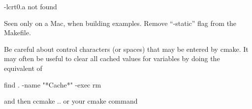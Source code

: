 \begin{codeenv}
-lcrt0.a  not found
\end{codeenv}
Seen only on a Mac, when building examples. Remove ``-static'' flag from the
Makefile.


Be careful about control characters (or spaces) that may be entered by cmake.
It may often be useful to clear all cached values for variables by doing the equivalent of 


\begin{codeenv}
find . -name "*Cache*" -exec rm {} \;
\end{codeenv}
and then ccmake ..
or your cmake command
